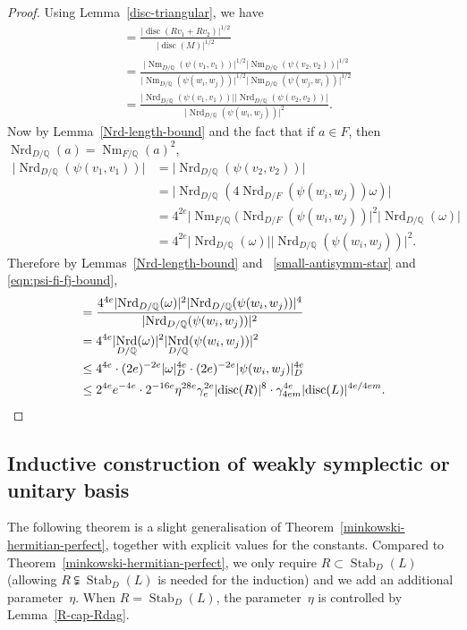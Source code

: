 \documentclass[JEP,XML,SOM,Unicode,NoFloatCountersInSection]{cedram}
\newcommand{\bQ}{\mathbb{Q}}
\DeclareMathOperator{\disc}{disc}
\DeclareMathOperator{\Nm}{Nm}
\DeclareMathOperator{\Nrd}{Nrd}
\DeclareMathOperator{\Stab}{Stab}
\newcommand{\abs}[1]{\lvert #1 \rvert}
\begin{document}
\begin{proof}
Using Lemma~\ref{disc-triangular}, we have
\begin{align*}
[M : Rv_1 + Rv_2]
& = \frac{\abs{\disc(Rv_1 + Rv_2)}^{1/2}}{\abs{\disc(M)}^{1/2}}
\\& = \frac{\abs{\Nm_{D/\bQ}(\psi(v_1, v_1))}^{1/2} \abs{\Nm_{D/\bQ}(\psi(v_2, v_2))}^{1/2}}{\abs{\Nm_{D/\bQ}(\psi(w_i, w_j))}^{1/2} \abs{\Nm_{D/\bQ}(\psi(w_j, w_i))}^{1/2}}
\\& = \frac{\abs{\Nrd_{D/\bQ}(\psi(v_1, v_1))} \abs{\Nrd_{D/\bQ}(\psi(v_2, v_2))}}{\abs{\Nrd_{D/\bQ}(\psi(w_i, w_j))}^2}.
\end{align*}
Now by Lemma~\ref{Nrd-length-bound} and the fact that if $a \in F$, then $\Nrd_{D/\bQ}(a) = \Nm_{F/\bQ}(a)^2$,
\begin{align*}
\abs{\Nrd_{D/\bQ}(\psi(v_1, v_1))}
& = \abs{\Nrd_{D/\bQ}(\psi(v_2, v_2))}
\\& = \abs{\Nrd_{D/\bQ}(4 \Nrd_{D/F}(\psi(w_i, w_j)) \omega)}
\\& = 4^{2e} \abs{\Nm_{F/\bQ}(\Nrd_{D/F}(\psi(w_i, w_j))}^2 \abs{\Nrd_{D/\bQ}(\omega)}
\\& = 4^{2e} \abs{\Nrd_{D/\bQ}(\omega)} \abs{\Nrd_{D/\bQ}(\psi(w_i, w_j))}^2.
\end{align*}
Therefore by Lemmas~\ref{Nrd-length-bound} and~ \ref{small-antisymm-star} and \eqref{eqn:psi-fi-fj-bound},
\begin{align*}
[M : Rv_1 + Rv_2]
& = \frac{4^{4e} \abs{\Nrd_{D/\bQ}(\omega)}^2 \abs{\Nrd_{D/\bQ}(\psi(w_i, w_j))}^4}{\abs{\Nrd_{D/\bQ}(\psi(w_i, w_j))}^2}
\\& = 4^{4e} \abs{\Nrd_{D/\bQ}(\omega)}^2 \abs{\Nrd_{D/\bQ}(\psi(w_i, w_j))}^2
\\& \leq 4^{4e} \cdot (2e)^{-2e} \abs{\omega}_D^{4e} \cdot (2e)^{-2e} \abs{\psi(w_i, w_j)}_D^{4e}
\\& \leq 2^{4e} e^{-4e} \cdot 2^{-16e} \eta^{28e} \gamma_e^{2e} \abs{\disc(R)}^8 \cdot \gamma_{4em}^{4e} \abs{\disc(L)}^{4e/4em}.
\qedhere
\end{align*}
\end{proof}

\subsection{Inductive construction of weakly symplectic or unitary basis}

The following theorem is a slight generalisation of Theorem~\ref{minkowski-hermitian-perfect}, together with explicit values for the constants.
Compared to Theorem~\ref{minkowski-hermitian-perfect}, we only require $R \subset \Stab_D(L)$ (allowing $R \subsetneqq \Stab_D(L)$ is needed for the induction) and we add an additional parameter~$\eta$.
When $R = \Stab_D(L)$, the parameter~$\eta$ is controlled by Lemma~\ref{R-cap-Rdag}.
\end{document}
